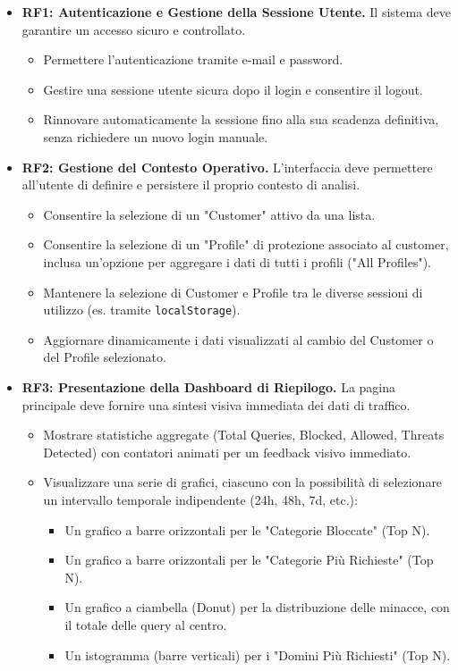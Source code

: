 \documentclass[12pt,a4paper,openright,twoside]{book}
\begin{document}
\begin{itemize}
    \item \textbf{RF1: Autenticazione e Gestione della Sessione Utente.} Il sistema deve garantire un accesso sicuro e controllato.
          \begin{itemize}
              \item Permettere l'autenticazione tramite e-mail e password.
              \item Gestire una sessione utente sicura dopo il login e consentire il logout.
              \item Rinnovare automaticamente la sessione fino alla sua scadenza definitiva, senza richiedere un nuovo login manuale.
          \end{itemize}

    \item \textbf{RF2: Gestione del Contesto Operativo.} L'interfaccia deve permettere all'utente di definire e persistere il proprio contesto di analisi.
          \begin{itemize}
              \item Consentire la selezione di un "Customer" attivo da una lista.
              \item Consentire la selezione di un "Profile" di protezione associato al customer, inclusa un'opzione per aggregare i dati di tutti i profili ("All Profiles").
              \item Mantenere la selezione di Customer e Profile tra le diverse sessioni di utilizzo (es. tramite \texttt{localStorage}).
              \item Aggiornare dinamicamente i dati visualizzati al cambio del Customer o del Profile selezionato.
          \end{itemize}

    \item \textbf{RF3: Presentazione della Dashboard di Riepilogo.} La pagina principale deve fornire una sintesi visiva immediata dei dati di traffico.
          \begin{itemize}
              \item Mostrare statistiche aggregate (Total Queries, Blocked, Allowed, Threats Detected) con contatori animati per un feedback visivo immediato.
              \item Visualizzare una serie di grafici, ciascuno con la possibilità di selezionare un intervallo temporale indipendente (24h, 48h, 7d, etc.):
                    \begin{itemize}
                        \item Un grafico a barre orizzontali per le "Categorie Bloccate" (Top N).
                        \item Un grafico a barre orizzontali per le "Categorie Più Richieste" (Top N).
                        \item Un grafico a ciambella (Donut) per la distribuzione delle minacce, con il totale delle query al centro.
                        \item Un istogramma (barre verticali) per i "Domini Più Richiesti" (Top N).
                    \end{itemize}
          \end{itemize}


\end{itemize}
\end{document}
